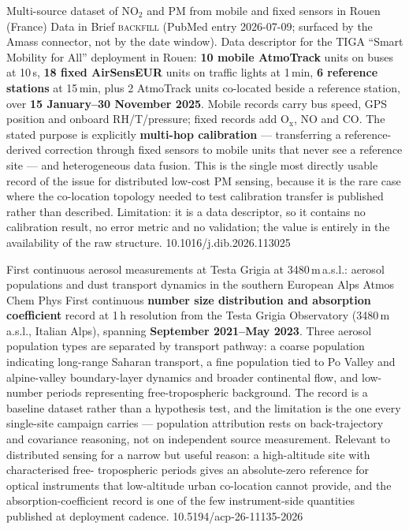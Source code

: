 \documentclass[10pt]{article}
\begin{document}
{Multi-source dataset of NO$_2$ and PM from mobile and fixed sensors in Rouen (France)}
{Data in Brief}
{\textsc{backfill} (PubMed entry 2026-07-09; surfaced by the Amass connector, not by the
date window). Data descriptor for the TIGA ``Smart Mobility for All'' deployment in Rouen:
\textbf{10 mobile AtmoTrack} units on buses at 10\,s, \textbf{18 fixed AirSensEUR} units
on traffic lights at 1\,min, \textbf{6 reference stations} at 15\,min, plus 2 AtmoTrack
units co-located beside a reference station, over \textbf{15 January--30 November 2025}.
Mobile records carry bus speed, GPS position and onboard RH/T/pressure; fixed records add
O$_\mathrm{x}$, NO and CO. The stated purpose is explicitly \textbf{multi-hop
calibration} --- transferring a reference-derived correction through fixed sensors to
mobile units that never see a reference site --- and heterogeneous data fusion. This is
the single most directly usable record of the issue for distributed low-cost PM sensing,
because it is the rare case where the co-location topology needed to test calibration
transfer is published rather than described. Limitation: it is a data descriptor, so it
contains no calibration result, no error metric and no validation; the value is entirely
in the availability of the raw structure.}
{10.1016/j.dib.2026.113025}

{First continuous aerosol measurements at Testa Grigia at 3480\,m\,a.s.l.: aerosol
populations and dust transport dynamics in the southern European Alps}
{Atmos Chem Phys}
{First continuous \textbf{number size distribution and absorption coefficient} record at
1\,h resolution from the Testa Grigia Observatory (3480\,m\,a.s.l., Italian Alps),
spanning \textbf{September 2021--May 2023}. Three aerosol population types are separated
by transport pathway: a coarse population indicating long-range Saharan transport, a fine
population tied to Po Valley and alpine-valley boundary-layer dynamics and broader
continental flow, and low-number periods representing free-tropospheric background. The
record is a baseline dataset rather than a hypothesis test, and the limitation is the one
every single-site campaign carries --- population attribution rests on back-trajectory and
covariance reasoning, not on independent source measurement. Relevant to distributed
sensing for a narrow but useful reason: a high-altitude site with characterised free-
tropospheric periods gives an absolute-zero reference for optical instruments that
low-altitude urban co-location cannot provide, and the absorption-coefficient record is
one of the few instrument-side quantities published at deployment cadence.}
{10.5194/acp-26-11135-2026}
\end{document}

